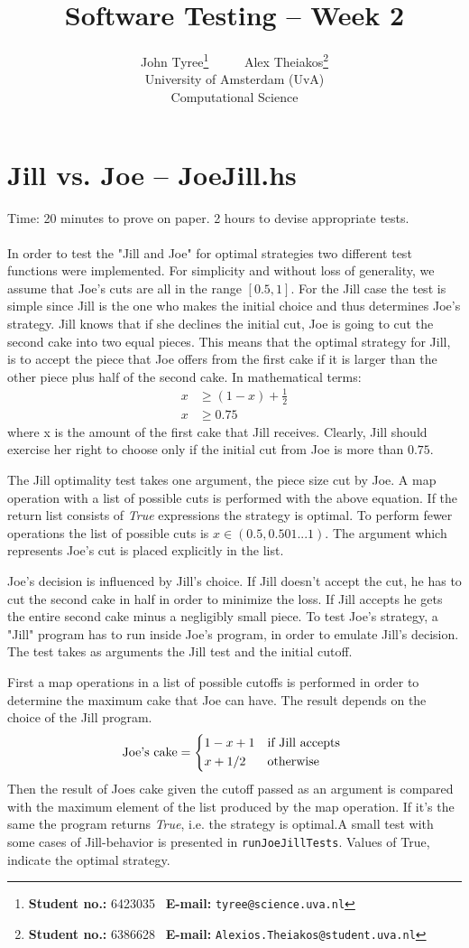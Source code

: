 \documentclass[11pt,a4paper]{article}
\title{\large \textbf{Software Testing} \--- Week 2}
\author{John Tyree\footnote{\textbf{Student no.:} 6423035 \textbar\ \textbf{E-mail:} \texttt{tyree@science.uva.nl}} \ \ \ \ \ Alex Theiakos\footnote{\textbf{Student no.:} 6386628 \textbar\ \textbf{E-mail:} \texttt{Alexios.Theiakos@student.uva.nl}} \\[15pt] University of Amsterdam (UvA) \\ Computational Science}
\date{}
\numberwithin{equation}{section}%
\begin{document}
\maketitle

\section{Jill vs. Joe \--- JoeJill.hs}
Time: 20 minutes to prove on paper. 2 hours to devise appropriate tests. \\ \\
In order to test the "Jill and Joe" for optimal strategies two different test functions were implemented. For simplicity and without loss of generality, we assume that Joe's cuts are all in the range $[0.5, 1]$.
For the Jill case the test is simple since Jill is the one who makes the initial choice and thus determines Joe's strategy. Jill knows that if she declines the initial cut, Joe is going to cut the second cake into two equal pieces.
This means that the optimal strategy for Jill, is to accept the piece that Joe offers from the first cake if it is larger than the other piece plus half of the second cake. In mathematical terms:
\begin{align*}
    x &\geq (1 - x) + \frac{1}{2} \\
    x &\geq 0.75
\end{align*}
where x is the amount of the first cake that Jill receives.
Clearly, Jill should exercise her right to choose only if the initial cut from Joe is more than $0.75$.

The Jill optimality test takes one argument, the piece size cut by Joe. A map operation with a list of possible cuts is performed with the above equation. If the return list consists of \emph{True} expressions the strategy is optimal. To perform fewer operations the list of possible cuts is $x\in (0.5,0.501...1)$. The argument which represents Joe's cut is placed explicitly in the list.

Joe's decision is influenced by Jill's choice. If Jill doesn't accept the cut, he has to cut the second cake in half in order to minimize the loss. If Jill accepts he gets the entire second cake minus a negligibly small piece.
To test Joe's strategy, a "Jill" program has to run inside Joe's program, in order to emulate Jill's decision. The test takes as arguments the Jill test and the initial cutoff. 

First a map operations in a list of possible cutoffs is performed in order to determine the maximum cake that Joe can have. The result depends on the choice of the Jill program.
\[
    \text{Joe's cake} =
    \begin{dcases*}
        1 - x + 1 & if Jill accepts \\
        x + 1/2 & otherwise
    \end{dcases*}
\]
Then the result of Joes cake given the cutoff passed as an argument is compared with the maximum element of the list produced by the map operation. If it's the same the program returns \emph{True}, i.e. the strategy is optimal.A small test with some cases of Jill-behavior is presented in \texttt{runJoeJillTests}. Values of True, indicate the optimal strategy.
\end{document}
